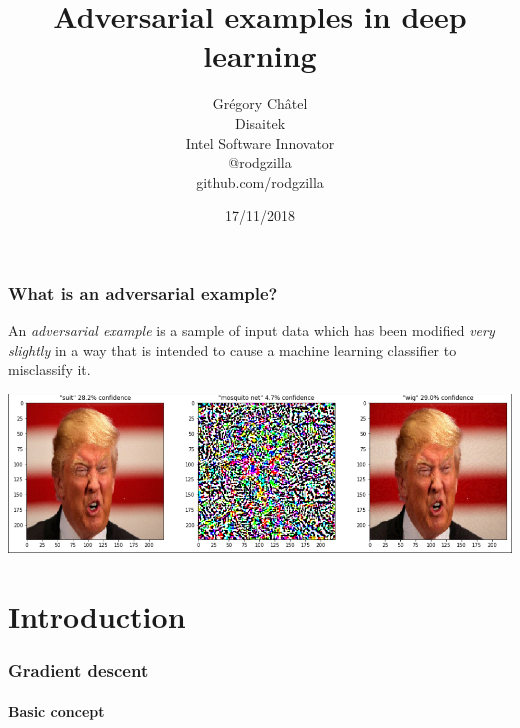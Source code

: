 \documentclass[9pt]{beamer}
\title{Adversarial examples in deep learning}
\author[G. Châtel]{Grégory Châtel\\\vspace{0.3cm}Disaitek\\Intel Software Innovator\\\vspace{0.3cm}@rodgzilla\\github.com/rodgzilla}
\date{17/11/2018}
\begin{document}

\begin{frame}

  \maketitle

\end{frame}

\begin{frame}
  \frametitle{What is an adversarial example?}

  An \emph{adversarial example} is a sample of input data which has
  been modified \emph{very slightly} in a way that is intended to
  cause a machine learning classifier to misclassify it.

  \bigskip

  \pause

  \begin{center}
    \includegraphics[trim={2pt 2pt 2pt 0}, clip, width =
      \linewidth]{images/adversarial_example_wig.png}
  \end{center}

\end{frame}

\section{Introduction}

\begin{frame}
  \frametitle{Gradient descent}

  \framesubtitle{Basic concept}

  \begin{center}
    \scalebox{0.8}{
      
    }
  \end{center}

\end{frame}
\end{document}
